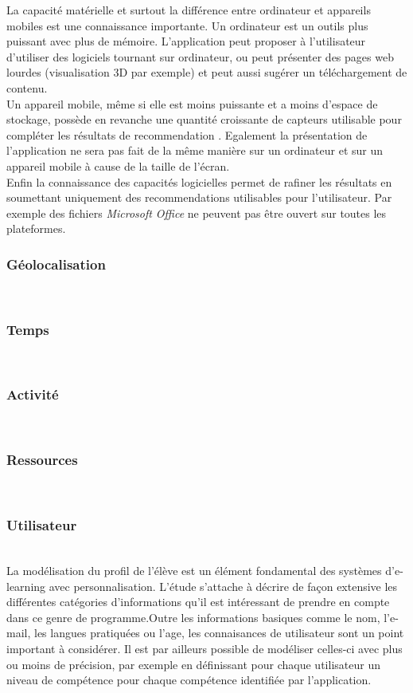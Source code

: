 \documentclass[conference]{./sty/IEEEtran}
\begin{document}
La capacité matérielle et surtout la différence entre ordinateur et appareils
mobiles est une connaissance importante. Un ordinateur est un outils plus
puissant avec plus de mémoire. L'application peut proposer à l'utilisateur
d'utiliser des logiciels tournant sur ordinateur, ou peut présenter des pages
web lourdes (visualisation 3D par exemple) et peut aussi sugérer un
téléchargement de contenu. \\
Un appareil mobile, même si elle est moins puissante et a moins d'espace de
stockage, possède en revanche une quantité croissante de capteurs utilisable
pour compléter les résultats de recommendation \cite{DBLP:conf/wstst/Kurti08}.
Egalement la présentation de l'application ne sera pas fait de la même manière
sur un ordinateur et sur un appareil mobile à cause de la taille de l'écran. \\

Enfin la connaissance des capacités logicielles permet de rafiner les résultats
en soumettant uniquement des recommendations utilisables pour l'utilisateur.
Par exemple des fichiers \emph{Microsoft Office} ne peuvent pas être ouvert sur
toutes les plateformes. \\

\subsubsection{Géolocalisation}
~\\

\subsubsection{Temps}
~\\

\subsubsection{Activité}
~\\

\subsubsection{Ressources}
~\\

\subsubsection{Utilisateur}
~\\
La modélisation du profil de l'élève est un élément fondamental des systèmes
d'e-learning avec personnalisation. L'étude
\cite{DBLP:journals/tlt/VerbertMOWDBD12} s'attache à décrire de façon extensive
les différentes catégories d'informations qu'il est intéressant de prendre en
compte dans ce genre de programme.Outre les informations basiques comme le nom,
l'e-mail, les langues pratiquées ou l'age, les connaisances de utilisateur sont
un point important à considérer. Il est par ailleurs possible de modéliser
celles-ci avec plus ou moins de précision, par exemple en définissant pour
chaque utilisateur un niveau de compétence pour chaque compétence identifiée
par l'application\cite{DBLP:journals/jucs/SternKHKL10}. \\
\end{document}

